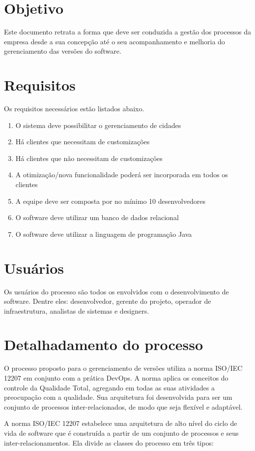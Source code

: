 \documentclass[	DIV=calc,%
							paper=a4,%
							fontsize=12pt,%
							onecolumn]{scrartcl}	 					%
\begin{document}
\section{Objetivo}
Este documento retrata a forma que deve ser conduzida a gestão dos processos da empresa desde a sua concepção até o seu acompanhamento e melhoria do gerenciamento das versões do software.

\section{Requisitos}
Os requisitos necessários estão listados abaixo.

\begin{enumerate}
	\item O sistema deve possibilitar o gerenciamento de cidades
	\item Há clientes que necessitam de customizações
	\item Há clientes que não necessitam de customizações
	\item A otimização/nova funcionalidade poderá ser incorporada em todos os clientes
	\item A equipe deve ser composta por no mínimo 10 desenvolvedores
	\item O software deve utilizar um banco de dados relacional 
	\item O software deve utilizar a linguagem de programação Java
\end{enumerate}

\section{Usuários}
Os usuários do processo são todos os envolvidos com o desenvolvimento de software. Dentre eles: desenvolvedor, gerente do projeto, operador de infraestrutura, analistas de sistemas e designers.

\section{Detalhadamento do processo }
O processo proposto para o gerenciamento de versões utiliza a norma ISO/IEC 12207 em conjunto com a prática DevOps.
A norma aplica os conceitos do controle da Qualidade Total, agregando em todas as suas atividades a preocupação com a qualidade. Sua arquitetura foi desenvolvida para ser um conjunto de processos inter-relacionados, de modo que seja flexível e adaptável.

A norma ISO/IEC 12207 estabelece uma arquitetura de alto nível do ciclo de vida de software que é construída a partir de um conjunto de processos e seus inter-relacionamentos. Ela divide as classes do processo em três tipos:
\end{document}

